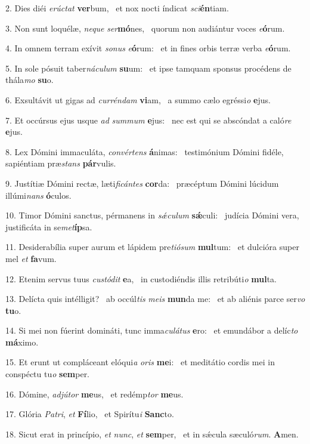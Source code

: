 2. Dies diéi \textit{e}\textit{rúc}\textit{tat} \textbf{ver}bum, \ast\  et nox nocti índicat \textit{sci}\textbf{én}tiam.\

3. Non sunt loquélæ, \textit{ne}\textit{que} \textit{ser}\textbf{mó}nes, \ast\  quorum non audiántur voces \textit{e}\textbf{ó}rum.\

4. In omnem terram exívit \textit{so}\textit{nus} \textit{e}\textbf{ó}rum: \ast\  et in fines orbis terræ verba \textit{e}\textbf{ó}rum.\

5. In sole pósuit taber\textit{ná}\textit{cu}\textit{lum} \textbf{su}um: \ast\  et ipse tamquam sponsus procédens de thála\textit{mo} \textbf{su}o.\

6. Exsultávit ut gigas ad \textit{cur}\textit{rén}\textit{dam} \textbf{vi}am, \ast\  a summo cælo egréssi\textit{o} \textbf{e}jus.\

7. Et occúrsus ejus usque \textit{ad} \textit{sum}\textit{mum} \textbf{e}jus: \ast\  nec est qui se abscóndat a caló\textit{re} \textbf{e}jus.\

8. Lex Dómini immaculáta, \textit{con}\textit{vér}\textit{tens} \textbf{á}nimas: \ast\  testimónium Dómini fidéle, sapiéntiam præ\textit{stans} \textbf{pár}vulis.\

9. Justítiæ Dómini rectæ, læti\textit{fi}\textit{cán}\textit{tes} \textbf{cor}da: \ast\  præcéptum Dómini lúcidum illúmi\textit{nans} \textbf{ó}culos.\

10. Timor Dómini sanctus, pérmanens in \textit{sǽ}\textit{cu}\textit{lum} \textbf{sǽ}culi: \ast\  judícia Dómini vera, justificáta in se\textit{met}\textbf{íp}sa.\

11. Desiderabília super aurum et lápidem pre\textit{ti}\textit{ó}\textit{sum} \textbf{mul}tum: \ast\  et dulcióra super mel \textit{et} \textbf{fa}vum.\

12. Etenim servus tuus \textit{cus}\textit{tó}\textit{dit} \textbf{e}a, \ast\  in custodiéndis illis retribúti\textit{o} \textbf{mul}ta.\

13. Delícta quis intélligit? \dag\  ab occúl\textit{tis} \textit{me}\textit{is} \textbf{mun}da me: \ast\  et ab aliénis parce ser\textit{vo} \textbf{tu}o.\

14. Si mei non fúerint domináti, tunc imma\textit{cu}\textit{lá}\textit{tus} \textbf{e}ro: \ast\  et emundábor a delíc\textit{to} \textbf{má}ximo.\

15. Et erunt ut compláceant elóqui\textit{a} \textit{o}\textit{ris} \textbf{me}i: \ast\  et meditátio cordis mei in conspéctu tu\textit{o} \textbf{sem}per.\

16. Dómine, \textit{ad}\textit{jú}\textit{tor} \textbf{me}us, \ast\  et redémp\textit{tor} \textbf{me}us.\

17. Glória \textit{Pa}\textit{tri}, \textit{et} \textbf{Fí}lio, \ast\  et Spirítu\textit{i} \textbf{Sanc}to.\

18. Sicut erat in princípio, \textit{et} \textit{nunc}, \textit{et} \textbf{sem}per, \ast\  et in sǽcula sæculó\textit{rum}. \textbf{A}men.\

